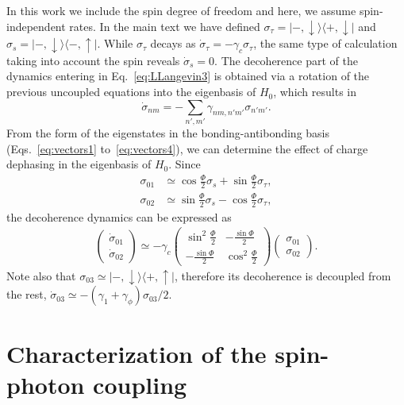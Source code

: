 \documentclass[twocolumn,english,aps,prl,preprint,reprint,showpacs,longbibliography,showkeys]{revtex4-1}
\begin{document}
In this work we include the spin degree of freedom and here, we assume spin-independent rates. 
In the main text we have defined  
$\sigma_{\tau}=\left|-,\downarrow\rangle\langle+,\downarrow\right|$ and $\sigma_{s}=\left|-,\downarrow\rangle\langle -,\uparrow\right|$.  While $\sigma_{\tau}$  decays as
 $\dot{\sigma}_{\tau}=-\gamma_c \sigma_{\tau}$,
the same type of calculation taking into account the spin reveals 
$\dot{\sigma}_s=0$.
The decoherence part of the dynamics entering in Eq.~\eqref{eq:LLangevin3} is obtained via a rotation of the previous uncoupled equations into the eigenbasis of $H_{0}$, which results in
\begin{equation}
\dot{\sigma}_{nm}=-\sum_{n',m'}\gamma _{nm,n'm'} \sigma_{n'm'}.
\end{equation}
From the form of the eigenstates in the bonding-antibonding basis (Eqs.~\eqref{eq:vectors1} to~\eqref{eq:vectors4}),  we can determine the effect of charge dephasing in the eigenbasis of $H_{0}$. 
Since
\begin{eqnarray}
\sigma_{01} & \simeq \cos{\frac{\Phi}{2}}\sigma_s+\sin{\frac{\Phi}{2}}\sigma_{\tau}, \label{eq:01abbasis}\\
\sigma_{02} & \simeq \sin{\frac{\Phi}{2}}\sigma_s-\cos{\frac{\Phi}{2}}\sigma_{\tau}, \label{eq:02abbasis}
\end{eqnarray}
the decoherence dynamics  can be expressed as
\begin{eqnarray}
\begin{pmatrix}
\dot{\sigma}_{01} \\
\dot{\sigma}_{02} 
\end{pmatrix}\simeq-\gamma_c\begin{pmatrix}
\sin^2\frac{\Phi}{2} &  -\frac{\sin{\Phi}}{2} \\
-\frac{\sin{\Phi}}{2} &\cos^2\frac{\Phi}{2} 
\end{pmatrix}
\begin{pmatrix}
\sigma_{01} \\
\sigma_{02} 
\end{pmatrix}
.\label{eq:dmatrix}
\end{eqnarray}
Note also that $\sigma_{03}\simeq \left|-,\downarrow\rangle\langle+,\uparrow\right|$, therefore its decoherence is decoupled from the rest, $\dot{\sigma}_{03}\simeq-(\gamma_1+\gamma_{\phi})\sigma_{03}/2$.



\section{Characterization of the spin-photon coupling\label{sec:SC}}
 
\end{document}
